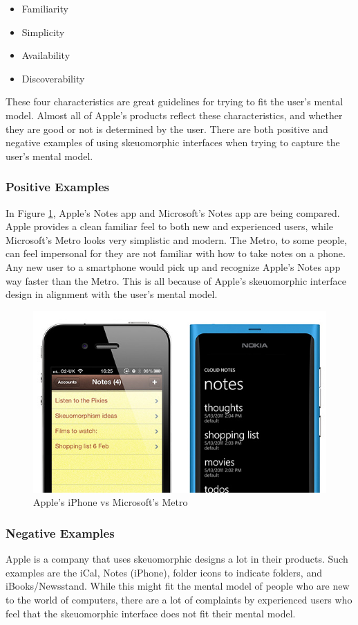 \documentclass{article}
\begin{document}
\begin{itemize}
\item Familiarity
\item Simplicity
\item Availability
\item Discoverability 
\end{itemize}

These four characteristics are great guidelines for trying to fit the user's mental model.  Almost all of Apple's products reflect these characteristics, and whether they are good or not is determined by the user.  There are both positive and negative examples of using skeuomorphic interfaces when trying to capture the user's mental model.

\subsubsection{Positive Examples}

In Figure \ref{apple-metro}, Apple's Notes app and Microsoft's Notes app are being compared.  Apple provides a clean familiar feel to both new and experienced users, while Microsoft's Metro looks very simplistic and modern.  The Metro, to some people, can feel impersonal for they are not familiar with how to take notes on a phone.  Any new user to a smartphone would pick up and recognize Apple's Notes app way faster than the Metro.  This is all because of Apple's skeuomorphic interface design in alignment with the user's mental model.

\begin{figure}[H]
\centering
\includegraphics[width=4.5in]{iphone-metro.jpg} 

\caption{Apple's iPhone vs Microsoft's Metro}
\label{apple-metro}
\end{figure}

\subsubsection{Negative Examples}
Apple is a company that uses skeuomorphic designs a lot in their products. Such examples are the iCal, Notes (iPhone), folder icons to indicate folders, and iBooks/Newsstand.  While this might fit the mental model of people who are new to the world of computers, there are a lot of complaints by experienced users who feel that the skeuomorphic interface does not fit their mental model. 
\end{document}

